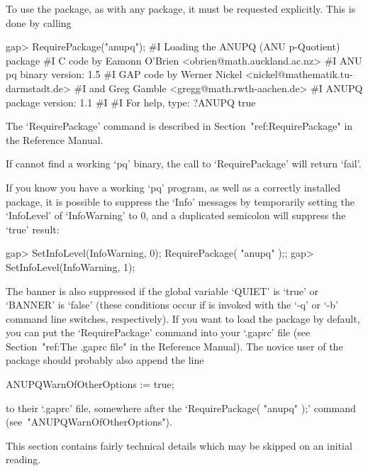 \endlist


To use the {\ANUPQ} package, as with  any  {\GAP}  package,  it  must  be
requested explicitly. This is done by calling

\beginexample
gap> RequirePackage("anupq");
#I    Loading the ANUPQ (ANU p-Quotient) package
#I    C code by  Eamonn O'Brien <obrien@math.auckland.ac.nz>
#I                ANU pq binary version: 1.5
#I    GAP code by Werner Nickel <nickel@mathematik.tu-darmstadt.de>
#I            and   Greg Gamble  <gregg@math.rwth-aachen.de>
#I                ANUPQ package version: 1.1
#I  
#I                For help, type: ?ANUPQ
true
\endexample

The `RequirePackage' command is described in Section~"ref:RequirePackage"
in the {\GAP} Reference Manual.

If {\GAP} cannot find a working `pq' binary, the call to `RequirePackage'
will return `fail'.

If you know you have a working `pq'  program,  as  well  as  a  correctly
installed {\ANUPQ}  package,  it  is  possible  to  suppress  the  `Info'
messages by temporarily setting the `InfoLevel' of  `InfoWarning'  to  0,
and a duplicated semicolon will suppress the `true' result:

\beginexample
gap> SetInfoLevel(InfoWarning, 0); RequirePackage( "anupq" );;
gap> SetInfoLevel(InfoWarning, 1);
\endexample

The banner is also suppressed if the global {\GAP}  variable  `QUIET'  is
`true' or `BANNER' is  `false'  (these  conditions  occur  if  {\GAP}  is
invoked with the `-q' or `-b' command line  switches,  respectively).  If
you want to load the  {\ANUPQ}  package  by  default,  you  can  put  the
`RequirePackage' command into your `.gaprc'  file  (see  Section~"ref:The
.gaprc file" in the {\GAP} Reference Manual).  The  novice  user  of  the
{\ANUPQ} package should probably also append the line

\begintt
ANUPQWarnOfOtherOptions := true;
\endtt

to their `.gaprc' file, somewhere after the  `RequirePackage( "anupq" );'
command (see~"ANUPQWarnOfOtherOptions").


This section contains fairly technical details which may be skipped on an
initial reading.

